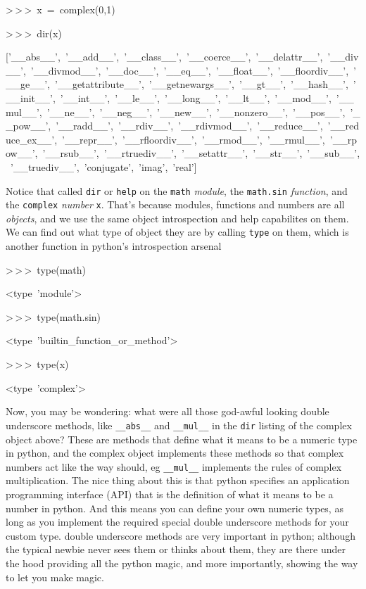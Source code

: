 \begin{lyxcode}
>\,{}>\,{}>~x~=~complex(0,1)

>\,{}>\,{}>~dir(x)

{[}'\_\_abs\_\_',~'\_\_add\_\_',~'\_\_class\_\_',~'\_\_coerce\_\_',~'\_\_delattr\_\_',~'\_\_div\_\_',~'\_\_divmod\_\_',~'\_\_doc\_\_',~'\_\_eq\_\_',~'\_\_float\_\_',~'\_\_floordiv\_\_',~'\_\_ge\_\_',~'\_\_getattribute\_\_',~'\_\_getnewargs\_\_',~'\_\_gt\_\_',~'\_\_hash\_\_',~'\_\_init\_\_',~'\_\_int\_\_',~'\_\_le\_\_',~'\_\_long\_\_',~'\_\_lt\_\_',~'\_\_mod\_\_',~'\_\_mul\_\_',~'\_\_ne\_\_',~'\_\_neg\_\_',~'\_\_new\_\_',~'\_\_nonzero\_\_',~'\_\_pos\_\_',~'\_\_pow\_\_',~'\_\_radd\_\_',~'\_\_rdiv\_\_',~'\_\_rdivmod\_\_',~'\_\_reduce\_\_',~'\_\_reduce\_ex\_\_',~'\_\_repr\_\_',~'\_\_rfloordiv\_\_',~'\_\_rmod\_\_',~'\_\_rmul\_\_',~'\_\_rpow\_\_',~'\_\_rsub\_\_',~'\_\_rtruediv\_\_',~'\_\_setattr\_\_',~'\_\_str\_\_',~'\_\_sub\_\_',~'\_\_truediv\_\_',~'conjugate',~'imag',~'real']


\end{lyxcode}
Notice that called \texttt{dir} or \texttt{help} on the \texttt{math}
\textit{module}, the \texttt{math.sin} \textit{function}, and the
\texttt{complex} \textit{number} \texttt{x}. That's because modules,
functions and numbers are all \textit{objects}, and we use the same
object introspection and help capabilites on them. We can find out
what type of object they are by calling \texttt{type} on them, which
is another function in python's introspection arsenal

\begin{lyxcode}
>\,{}>\,{}>~type(math)

<type~'module'>

>\,{}>\,{}>~type(math.sin)

<type~'builtin\_function\_or\_method'>

>\,{}>\,{}>~type(x)

<type~'complex'>


\end{lyxcode}
Now, you may be wondering: what were all those god-awful looking double
underscore methods, like \texttt{\_\_abs\_\_} and \texttt{\_\_mul\_\_}
in the \texttt{dir} listing of the complex object above? These are
methods that define what it means to be a numeric type in python,
and the complex object implements these methods so that complex numbers
act like the way should, eg \texttt{\_\_mul\_\_} implements the rules
of complex multiplication. The nice thing about this is that python
specifies an application programming interface (API) that is the definition
of what it means to be a number in python. And this means you can
define your own numeric types, as long as you implement the required
special double underscore methods for your custom type. double underscore
methods are very important in python; although the typical newbie
never sees them or thinks about them, they are there under the hood
providing all the python magic, and more importantly, showing the
way to let you make magic.


